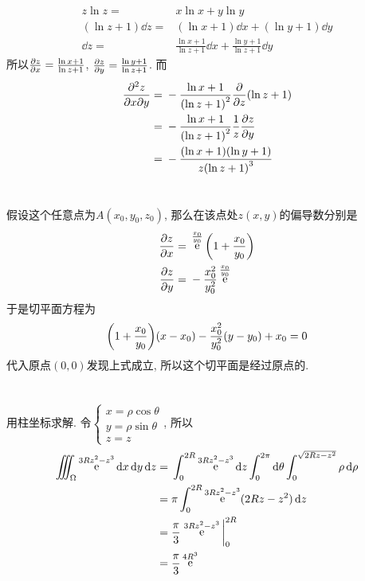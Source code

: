 \documentclass[12pt]{ctexart}
\DeclareMathOperator{\ee}{\mathrm{e}}
\begin{document}
\section{}
\begin{align*}
	z\ln{z}={}&x\ln{x}+y\ln{y}\\
	(\ln{z}+1)\dd{z}={}&(\ln{x}+1)\dd{x}+(\ln{y}+1)\dd{y}\\
	\dd{z}={}&\frac{\ln{x}+1}{\ln{z}+1}\dd{x}+\frac{\ln{y}+1}{\ln{z}+1}\dd{y}
\end{align*}
所以$\pdv{z}{x}=\frac{\ln{x}+1}{\ln{z}+1}$, $\pdv{z}{y}=\frac{\ln{y}+1}{\ln{z}+1}$. 而
\begin{align*}
	\pdv{z}{x}{y}={}&-\frac{\ln{x}+1}{\qty(\ln{z}+1)^2}\pdv{z}(\ln{z}+1)\\
	={}&-\frac{\ln{x}+1}{\qty(\ln{z}+1)^2}\frac{1}{z}\pdv{z}{y}\\
	={}&-\frac{\qty(\ln{x}+1)\qty(\ln{y}+1)}{z\qty(\ln{z}+1)^3}
\end{align*}
\section{}
假设这个任意点为$A(x_0,y_0,z_0)$, 那么在该点处$z(x,y)$的偏导数分别是
\begin{align*}
	\pdv{z}{x}={}&\ee^{x_0\over y_0}\qty(1+\frac{x_0}{y_0})\\
	\pdv{z}{y}={}&-\frac{x_0^{2}}{y_0^{2}}\ee^{\frac{x_0}{y_0}}
\end{align*}
于是切平面方程为
\[\qty(1+\frac{x_0}{y_0})(x-x_0)-\frac{x_{0}^{2}}{y_{0}^{2}}(y-y_0)+x_0=0\]
代入原点$(0,0)$发现上式成立, 所以这个切平面是经过原点的.\par
\section{}
用柱坐标求解. 令$\begin{cases}
	x=\rho\cos\theta\\
	y=\rho\sin\theta\\
	z=z
\end{cases}$, 
所以
\begin{align*}
	\iiint_{\Omega}\ee^{3Rz^{2}-z^{3}}\dd{x}\dd{y}\dd{z}={}&\int_{0}^{2R}\ee^{3Rz^{2}-z^{3}}\dd{z}\int_{0}^{2\pi}\dd{\theta}\int_{0}^{\sqrt{2Rz-z^2}}\rho\dd{\rho}\\
	={}&\pi\int_{0}^{2R}\ee^{3Rz^{2}-z^{3}}(2Rz-z^{2})\dd{z}\\
	={}&\frac{\pi}{3}\eval{\ee^{3Rz^{2}-z^{3}}}_{0}^{2R}\\
	={}&\frac{\pi}{3}\ee^{4R^{3}}
\end{align*}
\end{document}
